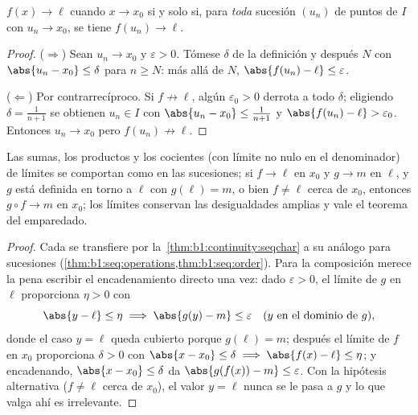 \begin{theorem}\label{thm:b1:continuity:seqchar}
$f(x) \to \ell$ cuando $x \to x_0$ si y solo si, para \emph{toda}
sucesión $(u_n)$ de puntos de $I$ con $u_n \to x_0$, se tiene
$f(u_n) \to \ell$.
\end{theorem}

\begin{proof}
($\Rightarrow$) Sean $u_n \to x_0$ y $\varepsilon > 0$. Tómese
$\delta$ de la definición y después $N$ con
$\abs{u_n - x_0} \leq \delta$ para $n \geq N$: más allá de $N$,
$\abs{f(u_n) - \ell} \leq \varepsilon$.

($\Leftarrow$) Por contrarrecíproco. Si $f \not\to \ell$, algún
$\varepsilon_0 > 0$ derrota a todo $\delta$; eligiendo
$\delta = \frac{1}{n+1}$ se obtienen $u_n \in I$ con
$\abs{u_n - x_0} \leq \frac{1}{n+1}$ y
$\abs{f(u_n) - \ell} > \varepsilon_0$. Entonces $u_n \to x_0$ pero
$f(u_n) \not\to \ell$.
\end{proof}

\begin{corollary}\label{cor:b1:continuity:operations}
Las sumas, los productos y los cocientes (con límite no nulo en el
denominador) de límites se comportan como en las sucesiones; si
$f \to \ell$ en $x_0$ y $g \to m$ en $\ell$, y $g$ está definida en
torno a $\ell$ con $g(\ell) = m$, o bien $f \neq \ell$ cerca de
$x_0$, entonces $g \circ f \to m$ en $x_0$; los límites conservan las
desigualdades amplias y vale el teorema del emparedado.
\end{corollary}

\begin{proof}
Cada  se transfiere por
la~\cref{thm:b1:continuity:seqchar} a su análogo para sucesiones
(\cref{thm:b1:seq:operations,thm:b1:seq:order}). Para la composición
merece la pena escribir el encadenamiento directo una vez: dado
$\varepsilon > 0$, el límite de $g$ en $\ell$ proporciona
$\eta > 0$ con
\[
\abs{y - \ell} \leq \eta \implies \abs{g(y) - m} \leq
\varepsilon \quad (y \text{ en el dominio de } g),
\]
donde el caso $y = \ell$ queda cubierto porque $g(\ell) = m$; después
el límite de $f$ en $x_0$ proporciona $\delta > 0$ con
$\abs{x - x_0} \leq \delta \implies \abs{f(x) - \ell} \leq \eta$; y
encadenando, $\abs{x - x_0} \leq \delta$ da
$\abs{g(f(x)) - m} \leq \varepsilon$. Con la hipótesis alternativa
($f \neq \ell$ cerca de $x_0$), el valor $y = \ell$ nunca se le pasa
a $g$ y lo que valga ahí es irrelevante.
\end{proof}

